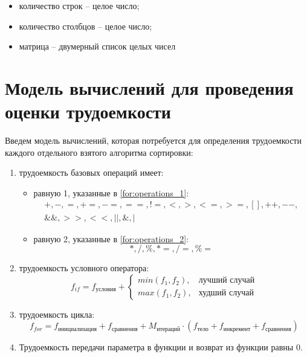 \begin{itemize}
	\item количество строк -- целое число;
	\item количество столбцов -- целое число;
	\item матрица -- двумерный список целых чисел
\end{itemize}

\section{Модель вычислений для проведения оценки трудоемкости}

Введем модель вычислений, которая потребуется для определения трудоемкости каждого отдельного взятого алгоритма сортировки:
\begin{enumerate}
	\item трудоемкость базовых операций имеет:
	\begin{itemize}
		\item равную 1, указанные в \ref{for:operations_1}:
		\begin{equation}
			\label{for:operations_1}
			\begin{aligned}
				+, -, =, +=, -=, ==, !=, <, >, <=, >=, [], ++, {-}-,\\
				\&\&, >>, <<, ||, \&, |
			\end{aligned}
		\end{equation}
		\item равную 2, указанные в \ref{for:operations_2}:
		\begin{equation}
			\label{for:operations_2}
			*, /, \%, *=, /=, \%=
		\end{equation}
	\end{itemize}
	\item трудоемкость условного оператора:
	\begin{equation}
		\label{for:if}
		f_{if} = f_{\text{условия}} + 
		\begin{cases}
			min(f_1, f_2), & \text{лучший случай}\\
			max(f_1, f_2), & \text{худший случай}
		\end{cases}
	\end{equation}
	\item трудоемкость цикла:
	\begin{equation}
		\label{for:for}
		f_{for} = f_{\text{инициализация}} + f_{\text{сравнения}} + M_{\text{итераций}} \cdot (f_{\text{тело}} + f_{\text{инкремент}} + f_{\text{сравнения}})
	\end{equation}
	\item Трудоемкость передачи параметра в функции и возврат из функции равны 0.
\end{enumerate}

